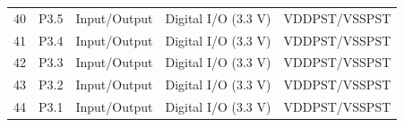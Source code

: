 \begin{longtable}[c]{ l l l l l }
\rowcolor{tablehighlightcolor} 40 & P3.5 & Input/Output & Digital I/O (3.3 V) & VDDPST/VSSPST \\
41 & P3.4 & Input/Output & Digital I/O (3.3 V) & VDDPST/VSSPST \\
\rowcolor{tablehighlightcolor} 42 & P3.3 & Input/Output & Digital I/O (3.3 V) & VDDPST/VSSPST \\
43 & P3.2 & Input/Output & Digital I/O (3.3 V) & VDDPST/VSSPST \\
\rowcolor{tablehighlightcolor} 44 & P3.1 & Input/Output & Digital I/O (3.3 V) & VDDPST/VSSPST \\
\hline
\end{longtable}
